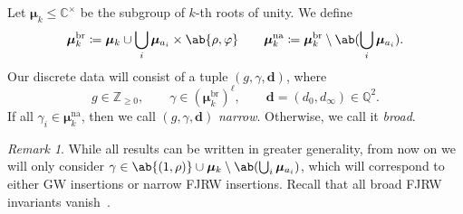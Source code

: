 \documentclass{amsart}
\theoremstyle{definition}
\theoremstyle{remark}
\newtheorem{rmk}[thm]{Remark}
\theoremstyle{plain}
\theoremstyle{definition}
\theoremstyle{remark}
\newcommand{\C}{\mathbb{C}}
\newcommand{\Z}{\mathbb{Z}}
\newcommand{\Q}{\mathbb{Q}}
\newcommand{\mbf}[1]{\mathbf{#1}}
\newcommand{\mr}[1]{\mathrm{#1}}
\newcommand{\1}{\mathbf{1}}
\newcommand{\2}{\mathbf{2}}
\newcommand{\3}{\mathbf{3}}
\newcommand{\bmu}{\bm{\mu}}
\begin{document}
Let $\bm{ \mu }_k \leq \C^{\times}$ be the subgroup of $k$-th roots of unity. We define
\[ \bm{\mu}_k^{\mr{br}} \coloneqq \bm{\mu}_k \cup \bigcup_{i} \bmu_{a_i} \times \ab\{\rho, \varphi\}  \qquad \bm{\mu}_k^{\mr{na}} \coloneqq \bm{\mu}_k^{\mr{br}} \setminus\ab(\bigcup_i \bmu_{a_i}). \]
Our discrete data will consist of a tuple $(g,\gamma, \mbf{d})$, where
\[ g \in \Z_{\geq 0}, \qquad \gamma \in (\bm{\mu}_k^{\mr{br}})^{\ell}, \qquad \mbf{d} = (d_0, d_{\infty}) \in \Q^2. \]
If all $\gamma_i \in \bmu_k^{\mr{na}}$, then we call $(g, \gamma,  \mbf{d})$ \textit{narrow}. Otherwise, we call it \textit{broad}.

\begin{rmk}
    While all results can be written in greater generality, from now on we will only consider $\gamma \in \ab\{ (1,\rho) \} \cup \bmu_k \setminus \ab(\bigcup_i \bmu_{a_i})$, which will correspond to either GW insertions or narrow FJRW insertions. Recall that all broad FJRW invariants vanish~\cite[Theorem 2.1]{wittentopchern}.
\end{rmk}
\end{document}
